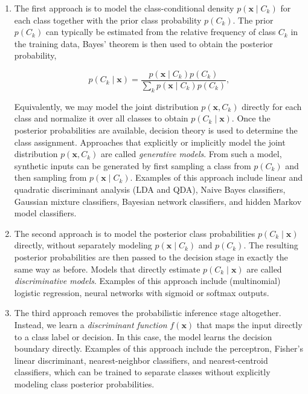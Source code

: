 \documentclass[10pt,twocolumn]{memoir}
\begin{document}
\begin{enumerate}
    \item The first approach is to model the class-conditional density $p(\mathbf{x}\mid C_k)$ for each class together with the prior class probability $p(C_k)$. The prior $p(C_k)$ can typically be estimated from the relative frequency of class $C_k$ in the training data, Bayes' theorem is then used to obtain the posterior probability,

    \begin{equation}
        p(C_k\mid\mathbf{x}) = \frac{p(\mathbf{x}\mid C_k)p(C_k)}{\sum_k p(\mathbf{x}\mid C_k)p(C_k)},
    \end{equation}

    Equivalently, we may model the joint distribution $p(\mathbf{x},C_k)$ directly for each class and normalize it over all classes to obtain $p(C_k\mid\mathbf{x})$. Once the posterior probabilities are available, decision theory is used to determine the class assignment. Approaches that explicitly or implicitly model the joint distribution $p(\mathbf{x},C_k)$ are called \textit{generative models}. From such a model, synthetic inputs can be generated by first sampling a class from $p(C_k)$ and then sampling from $p(\mathbf{x}\mid C_k)$. Examples of this approach include linear and quadratic discriminant analysis (LDA and QDA), Naive Bayes classifiers, Gaussian mixture classifiers, Bayesian network classifiers, and hidden Markov model classifiers.

    \item The second approach is to model the posterior class probabilities $p(C_k\mid\mathbf{x})$ directly, without separately modeling $p(\mathbf{x}\mid C_k)$ and $p(C_k)$. The resulting posterior probabilities are then passed to the decision stage in exactly the same way as before. Models that directly estimate $p(C_k\mid\mathbf{x})$ are called \textit{discriminative models}. Examples of this approach include (multinomial) logistic regression, neural networks with sigmoid or softmax outputs.

    \item The third approach removes the probabilistic inference stage altogether. Instead, we learn a \textit{discriminant function} $f(\mathbf{x})$ that maps the input directly to a class label or decision. In this case, the model learns the decision boundary directly. Examples of this approach include the perceptron, Fisher's linear discriminant, nearest-neighbor classifiers, and nearest-centroid classifiers, which can be trained to separate classes without explicitly modeling class posterior probabilities.

\end{enumerate}
\end{document}
